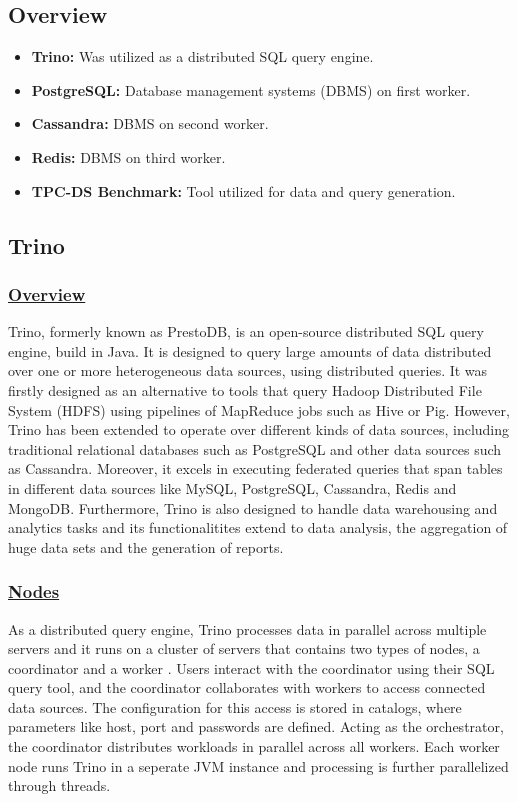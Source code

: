 \documentclass[conference]{IEEEtran}
\begin{document}
\subsection{Overview}

\begin{itemize}
	\item \textbf{Trino:} Was utilized as a distributed SQL query engine.
	\item \textbf{PostgreSQL:} Database management systems (DBMS) on first worker.
	\item \textbf{Cassandra:} DBMS on second worker.
	\item \textbf{Redis:} DBMS on third worker.
	\item \textbf{TPC-DS Benchmark:} Tool utilized for data and query generation.
\end{itemize}

\subsection{Trino}

\subsubsection{\textbf{\underline{Overview}}}
Trino, formerly known as PrestoDB, is an open-source distributed SQL query engine, build in Java. It is designed to query large amounts of data
distributed over one or more heterogeneous data sources, using distributed queries. It was firstly designed as an alternative to tools that query
Hadoop Distributed File System (HDFS) using pipelines of MapReduce jobs such as Hive or Pig. However, Trino has been extended to operate over different
kinds of data sources, including traditional relational databases such as PostgreSQL and other data sources such as Cassandra. Moreover, it excels in
executing federated queries that span tables in different data sources like MySQL, PostgreSQL, Cassandra, Redis and MongoDB. Furthermore, Trino is
also designed to handle data warehousing and analytics tasks and its functionalitites extend to data analysis, the aggregation of huge data sets and the generation of reports.

\subsubsection{\textbf{\underline{Nodes}}}
As a distributed query engine, Trino processes data in parallel across multiple servers and it runs on a cluster of servers that contains two types of nodes,
a coordinator and a worker \cite{b11} . Users interact with the coordinator using their SQL query tool, and the coordinator collaborates with workers to access connected
data sources. The configuration for this access is stored in catalogs, where parameters like host, port and passwords are defined. Acting as the orchestrator,
the coordinator distributes workloads in parallel across all workers. Each worker node runs Trino in a seperate JVM instance and processing is further parallelized through threads.
\end{document}
